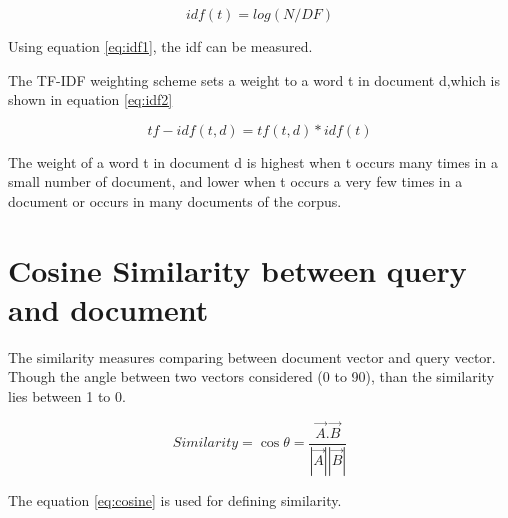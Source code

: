 \begin{equation}
idf(t) = log(N/DF)
\label{eq:idf1}
\end{equation}


Using equation \ref{eq:idf1}, the idf can be measured.

The TF-IDF weighting scheme sets a weight to a word t in document d,which is shown in equation \ref{eq:idf2}


\begin{equation}
tf -idf(t ,d) = tf (t ,d) * idf(t)
\label{eq:idf2}
\end{equation}


The weight of a word t in document d is highest when t occurs many times in a small number of document, and lower when t occurs a very few times in a document or occurs in many documents of the corpus.


\section{Cosine Similarity between query and document}

The similarity measures comparing between document vector and query vector. Though the angle between two vectors considered (0 to 90), than the similarity lies between 1 to 0.

\begin{equation}
Similarity = \cos\theta = \frac{\overrightarrow{A}.\overrightarrow{B}}{|\overrightarrow{A}||\overrightarrow{B}|}
\label{eq:cosine}
\end{equation}


The equation \ref{eq:cosine} is used for defining similarity.


